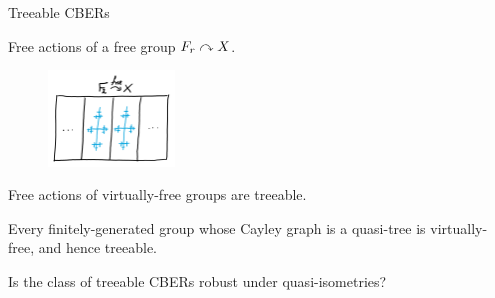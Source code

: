 \documentclass{beamer}
\begin{document}
    \begin{frame}{Treeable CBERs}
        \vspace{-0.2in}

        \begin{example}
            Free actions of a free group $F_r\curvearrowright X$.
        \end{example}

        \begin{figure}[h!]
            \vspace{-0.8in}
            \hfill
            \includegraphics[width=0.3\textwidth]{img/free_group_action.png}
        \end{figure}

        \pause
        \vspace{-0.28in}

        \begin{theorem}[JKL02]
            Free actions of virtually-free groups are treeable.
        \end{theorem}

        \pause

        \begin{theorem}[GdlH90]
            Every finitely-generated group whose Cayley graph is a quasi-tree is virtually-free, and hence treeable.
        \end{theorem}

        \pause

        \begin{question}
            Is the class of treeable CBERs robust under quasi-isometries?
        \end{question}
    \end{frame}
\end{document}
